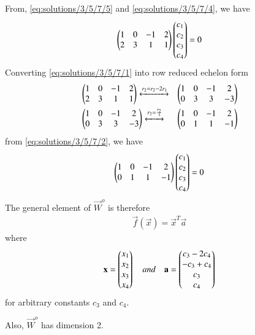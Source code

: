 From, \eqref{eq:solutions/3/5/7/5} and \eqref{eq:solutions/3/5/7/4}, we have
\begin{align}
\begin{pmatrix}1 & 0 & -1 & 2 \\ 2 & 3 & 1 & 1\end{pmatrix}\begin{pmatrix}c_1 \\ c_2 \\ c_3 \\ c_4\end{pmatrix} = 0 \label{eq:solutions/3/5/7/1}
\end{align} 
Converting \eqref{eq:solutions/3/5/7/1} into row reduced echelon form
\begin{align}
& \begin{pmatrix}1 & 0 & -1 & 2 \\ 2 & 3 & 1 & 1\end{pmatrix} \xleftrightarrow[]{r_2 = r_2 - 2r_1} & \begin{pmatrix}1 & 0 & -1 & 2 \\ 0 & 3 & 3 & -3\end{pmatrix} \\
& \begin{pmatrix}1 & 0 & -1 & 2 \\ 0 & 3 & 3 & -3\end{pmatrix} \xleftrightarrow[]{r_2 = \frac{r_2}{3}} & \begin{pmatrix}1 & 0 & -1 & 2 \\ 0 & 1 & 1 & -1\end{pmatrix} \label{eq:solutions/3/5/7/2}
\end{align}
from \eqref{eq:solutions/3/5/7/2}, we have
\begin{align}
\begin{pmatrix}1 & 0 & -1 & 2 \\ 0 & 1 & 1 & -1\end{pmatrix}\begin{pmatrix}c_1 \\ c_2 \\ c_3 \\ c_4\end{pmatrix} = 0
\end{align}
The general element of $\vec{W}^{o}$ is therefore
\begin{align}
 \vec{f}(\vec{x}) = \vec{x}^T\vec{a} 
\end{align}
where 
\begin{align}
\mathbf{x} = \begin{pmatrix}x_1 \\ x_2 \\ x_3 \\ x_4\end{pmatrix} \quad and \quad \mathbf{a} = \begin{pmatrix}c_3 - 2c_4 \\ -c_3 + c_4 \\ c_3 \\ c_4 \end{pmatrix}	
\end{align}
for arbitrary constants $c_3$ and $c_4$. 

Also, $\vec{W}^{o}$ has dimension 2.
